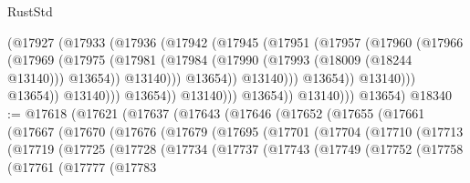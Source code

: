 \begin{lexlean}{RustStd}
\begin{coremodule}
                                      (@17927
                                        (@17933
                                          (@17936
                                            (@17942
                                              (@17945
                                                (@17951
                                                  (@17957
                                                    (@17960
                                                      (@17966
                                                        (@17969
                                                          (@17975
                                                            (@17981
                                                              (@17984
                                                                (@17990
                                                                  (@17993 (@18009 (@18244 @13140)))
                                                                  @13654))
                                                              @13140)))
                                                        @13654))
                                                    @13140)))
                                              @13654))
                                          @13140)))
                                    @13654))
                                @13140)))
                          @13654))
                      @13140)))
                @13654))
            @13140)))
      @13654)
@18340 := @17618
    (@17621
      (@17637
        (@17643
          (@17646
            (@17652
              (@17655
                (@17661
                  (@17667
                    (@17670
                      (@17676
                        (@17679
                          (@17695
                            (@17701
                              (@17704
                                (@17710
                                  (@17713
                                    (@17719
                                      (@17725
                                        (@17728
                                          (@17734
                                            (@17737
                                              (@17743
                                                (@17749
                                                  (@17752
                                                    (@17758
                                                      (@17761
                                                        (@17777
                                                          (@17783

\end{coremodule}
\end{lexlean}
